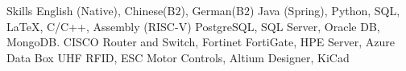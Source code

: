 
\begin{rubric}{Skills}
\entry*[Languages]
    English (Native), Chinese(B$2$), German(B$2$)
    Java (Spring), Python, SQL, \LaTeX, C/C++, Assembly (RISC-V)
\entry*[Databases]
    PostgreSQL, SQL Server, Oracle DB, MongoDB.
\entry*[Networking]
    CISCO Router and Switch, Fortinet FortiGate, HPE Server, Azure Data Box
\entry*[Misc.]
    UHF RFID, ESC Motor Controls, Altium Designer, KiCad
\end{rubric}
